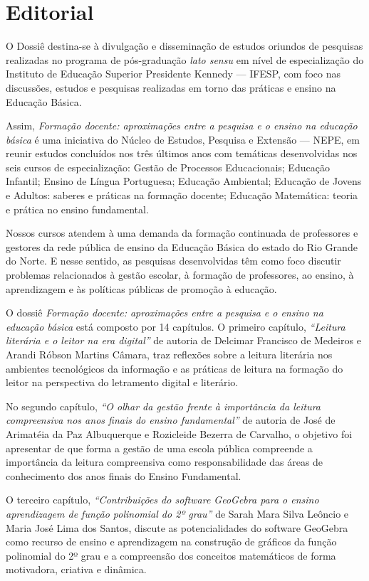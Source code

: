 \chapter{Editorial}

O Dossiê destina-se à divulgação e disseminação de estudos oriundos de
pesquisas realizadas no programa de pós-graduação \textit{lato sensu} em nível
de especialização do Instituto de Educação Superior Presidente Kennedy ---
IFESP, com foco nas discussões, estudos e pesquisas realizadas em torno das
práticas e ensino na Educação Básica.

Assim, \textit{Formação docente: aproximações entre a pesquisa e o ensino na
educação básica} é uma iniciativa do Núcleo de Estudos, Pesquisa e Extensão ---
NEPE, em reunir estudos concluídos nos três últimos anos com temáticas
desenvolvidas nos seis cursos de especialização: Gestão de Processos
Educacionais; Educação Infantil; Ensino de Língua Portuguesa; Educação
Ambiental; Educação de Jovens e Adultos: saberes e práticas na formação
docente; Educação Matemática: teoria e prática no ensino fundamental.

Nossos cursos atendem à uma demanda da formação continuada de professores e
gestores da rede pública de ensino da Educação Básica do estado do Rio Grande
do Norte. E nesse sentido, as pesquisas desenvolvidas têm como foco discutir
problemas relacionados à gestão escolar, à formação de professores, ao ensino,
à aprendizagem e às políticas públicas de promoção à educação.

O dossiê \textit{Formação docente: aproximações entre a pesquisa e o ensino na
educação básica} está composto por 14 capítulos. O primeiro capítulo,
\textit{“Leitura literária e o leitor na era digital”} de autoria de
Delcimar Francisco de Medeiros e Arandi Róbson Martins
Câmara, traz reflexões sobre a leitura literária nos ambientes tecnológicos da
informação e as práticas de leitura na formação do leitor na perspectiva do
letramento digital e literário.

No segundo capítulo, \textit{“O olhar da gestão frente à importância da leitura
compreensiva nos anos finais do ensino fundamental”} de autoria de José
de Arimatéia da Paz Albuquerque e Rozicleide Bezerra de Carvalho, o
objetivo foi apresentar de que forma a gestão de uma escola pública compreende
a importância da leitura compreensiva como responsabilidade das áreas de
conhecimento dos anos finais do Ensino Fundamental.

O terceiro capítulo, \textit{“Contribuições do software GeoGebra para
o ensino aprendizagem de função polinomial do 2º grau”} de Sarah Mara
Silva Leôncio e Maria José Lima dos Santos, discute as
potencialidades do software GeoGebra como recurso de ensino e
aprendizagem na construção de gráficos da função polinomial do 2º grau e a
compreensão dos conceitos matemáticos de forma motivadora, criativa e dinâmica.

